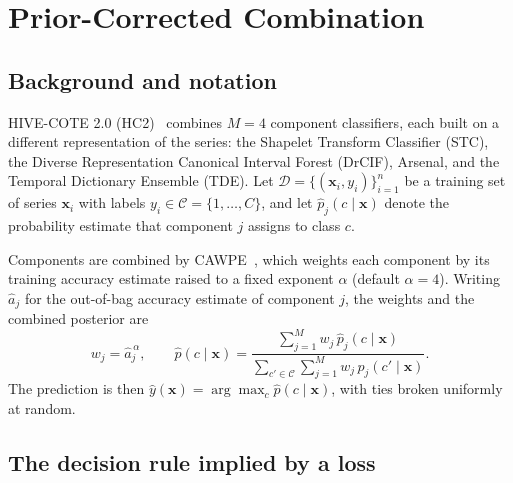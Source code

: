 %

\section{Prior-Corrected Combination}
\label{sec:prior-correction}

\subsection{Background and notation}

HIVE-COTE 2.0 (HC2)~\cite{middlehurst2021hc2} combines $M=4$ component classifiers, each
built on a different representation of the series: the Shapelet Transform Classifier
(STC), the Diverse Representation Canonical Interval Forest (DrCIF), Arsenal, and the
Temporal Dictionary Ensemble (TDE). Let $\mathcal{D}=\{(\mathbf{x}_i,y_i)\}_{i=1}^{n}$ be
a training set of series $\mathbf{x}_i$ with labels $y_i \in \mathcal{C} =
\{1,\dots,C\}$, and let $\hat{p}_j(c \mid \mathbf{x})$ denote the probability estimate
that component $j$ assigns to class $c$.

Components are combined by CAWPE~\cite{large2019cawpe}, which weights each component by
its training accuracy estimate raised to a fixed exponent $\alpha$ (default $\alpha=4$).
Writing $\hat{a}_j$ for the out-of-bag accuracy estimate of component $j$, the weights
and the combined posterior are
\begin{equation}
  w_j = \hat{a}_j^{\,\alpha},
  \qquad
  \hat{p}(c \mid \mathbf{x})
  = \frac{\sum_{j=1}^{M} w_j \, \hat{p}_j(c \mid \mathbf{x})}
         {\sum_{c' \in \mathcal{C}} \sum_{j=1}^{M} w_j \, \hat{p}_j(c' \mid \mathbf{x})}.
  \label{eq:cawpe}
\end{equation}
The prediction is then $\hat{y}(\mathbf{x}) = \arg\max_{c} \hat{p}(c \mid \mathbf{x})$,
with ties broken uniformly at random.

\subsection{The decision rule implied by a loss}

